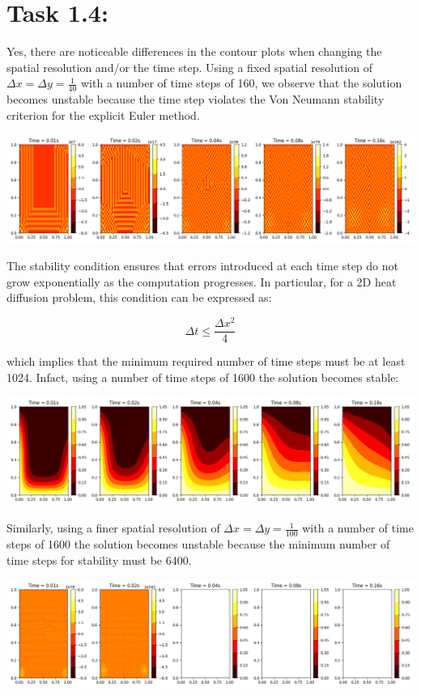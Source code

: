 \documentclass{article}
\begin{document}
\section*{\Large Task 1.4:}

Yes, there are noticeable differences in the contour plots when changing the spatial resolution and/or the time step.
Using a fixed spatial resolution of \( \Delta x = \Delta y = \frac{1}{40} \) with a number of time steps of 160, we observe that 
the solution becomes unstable because the time step violates the Von Neumann stability criterion for the explicit Euler method.

\includegraphics[width=\textwidth]{Figure_1.png}\par\vspace{1cm}

The stability condition ensures that errors introduced at each time step do not grow exponentially as
the computation progresses. In particular, for a 2D heat diffusion problem, this condition can be expressed as:

\[
\Delta t \leq \frac{\Delta x^2}{4}
\]

which implies that the minimum required number of time steps must be at least 1024. 
Infact, using a number of time steps of 1600 the solution becomes stable:

\includegraphics[width=\textwidth]{Figure_2.png}\par\vspace{1cm}

Similarly, using a finer spatial resolution of \( \Delta x = \Delta y = \frac{1}{100} \) with a number of
time steps of 1600 the solution becomes unstable because the minimum number of time steps for stability must be 6400.

\includegraphics[width=\textwidth]{Figure_3.png}\par\vspace{1cm}
\end{document}
